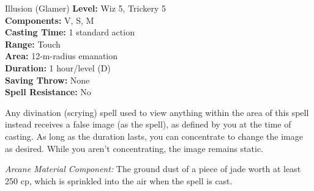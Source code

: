 {Illusion (Glamer)}
{
	\textbf{Level:}
	Wiz 5, Trickery 5\\
	\textbf{Components:}
	V, S, M\\
	\textbf{Casting Time:}
	1 standard action\\
	\textbf{Range:}
	Touch\\
	\textbf{Area:}
	12-m-radius emanation\\
	\textbf{Duration:}
	1 hour/level (D)\\
	\textbf{Saving Throw:}
	None\\
	\textbf{Spell Resistance:}
	No\\
}
{
	Any divination (scrying) spell used to view anything within the area of this spell instead receives a false image (as the  spell), as defined by you at the time of casting. As long as the duration lasts, you can concentrate to change the image as desired. While you aren't concentrating, the image remains static.

	\textit{Arcane Material Component:}
	The ground dust of a piece of jade worth at least 250 cp, which is sprinkled into the air when the spell is cast.

}
